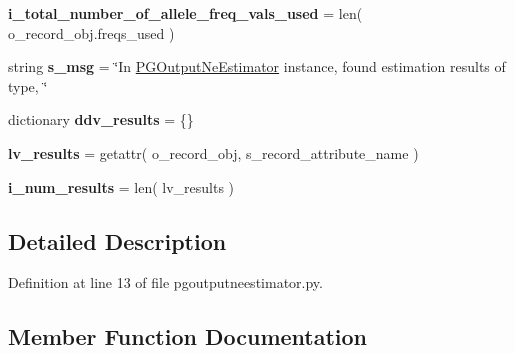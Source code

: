 \begin{DoxyCompactItemize}
\item 
{\bfseries i\+\_\+total\+\_\+number\+\_\+of\+\_\+allele\+\_\+freq\+\_\+vals\+\_\+used} = len( o\+\_\+record\+\_\+obj.\+freqs\+\_\+used )\hypertarget{classnegui_1_1pgoutputneestimator_1_1PGOutputNeEstimator_a05eba0b2b40d977f89f692f8669fc186}{}\label{classnegui_1_1pgoutputneestimator_1_1PGOutputNeEstimator_a05eba0b2b40d977f89f692f8669fc186}

\item 
string {\bfseries s\+\_\+msg} = \char`\"{}In \hyperlink{classnegui_1_1pgoutputneestimator_1_1PGOutputNeEstimator}{P\+G\+Output\+Ne\+Estimator} instance, found estimation results of type, \char`\"{}\hypertarget{classnegui_1_1pgoutputneestimator_1_1PGOutputNeEstimator_a1f169a14c674802fe24383032eed2bc0}{}\label{classnegui_1_1pgoutputneestimator_1_1PGOutputNeEstimator_a1f169a14c674802fe24383032eed2bc0}

\item 
dictionary {\bfseries ddv\+\_\+results} = \{\}\hypertarget{classnegui_1_1pgoutputneestimator_1_1PGOutputNeEstimator_a886cc26d58ac9300fa2e04d88248b15e}{}\label{classnegui_1_1pgoutputneestimator_1_1PGOutputNeEstimator_a886cc26d58ac9300fa2e04d88248b15e}

\item 
{\bfseries lv\+\_\+results} = getattr( o\+\_\+record\+\_\+obj, s\+\_\+record\+\_\+attribute\+\_\+name )\hypertarget{classnegui_1_1pgoutputneestimator_1_1PGOutputNeEstimator_ae3655bfefda334cf3f5e655f594c2c90}{}\label{classnegui_1_1pgoutputneestimator_1_1PGOutputNeEstimator_ae3655bfefda334cf3f5e655f594c2c90}

\item 
{\bfseries i\+\_\+num\+\_\+results} = len( lv\+\_\+results )\hypertarget{classnegui_1_1pgoutputneestimator_1_1PGOutputNeEstimator_aa05a2e25820e8c387cbde63aff708d40}{}\label{classnegui_1_1pgoutputneestimator_1_1PGOutputNeEstimator_aa05a2e25820e8c387cbde63aff708d40}

\end{DoxyCompactItemize}


\subsection{Detailed Description}


Definition at line 13 of file pgoutputneestimator.\+py.



\subsection{Member Function Documentation}
